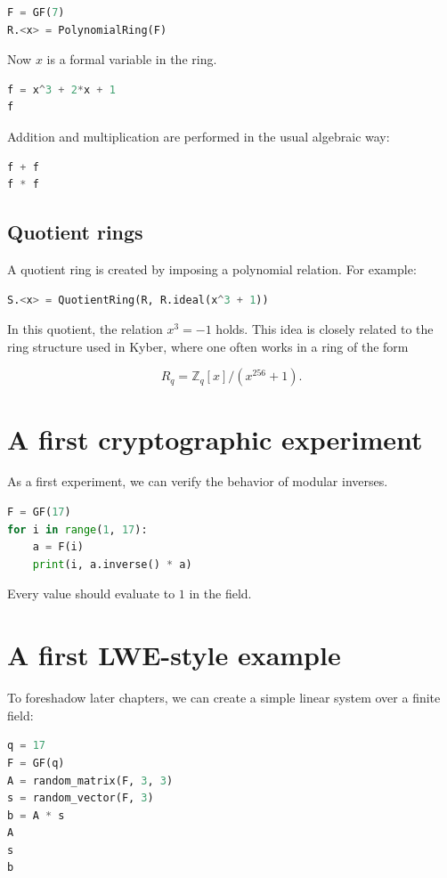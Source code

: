 \begin{lstlisting}[language=Python]
F = GF(7)
R.<x> = PolynomialRing(F)
\end{lstlisting}

Now $x$ is a formal variable in the ring.

\begin{lstlisting}[language=Python]
f = x^3 + 2*x + 1
f
\end{lstlisting}

Addition and multiplication are performed in the usual algebraic way:

\begin{lstlisting}[language=Python]
f + f
f * f
\end{lstlisting}

\subsection{Quotient rings}
A quotient ring is created by imposing a polynomial relation. For example:

\begin{lstlisting}[language=Python]
S.<x> = QuotientRing(R, R.ideal(x^3 + 1))
\end{lstlisting}

In this quotient, the relation $x^3 = -1$ holds. This idea is closely related to the ring structure used in Kyber, where one often works in a ring of the form

\[
R_q = \mathbb{Z}_q[x]/(x^{256}+1).
\]

\section{A first cryptographic experiment}
As a first experiment, we can verify the behavior of modular inverses.

\begin{lstlisting}[language=Python]
F = GF(17)
for i in range(1, 17):
    a = F(i)
    print(i, a.inverse() * a)
\end{lstlisting}

Every value should evaluate to $1$ in the field.

\section{A first LWE-style example}
To foreshadow later chapters, we can create a simple linear system over a finite field:

\begin{lstlisting}[language=Python]
q = 17
F = GF(q)
A = random_matrix(F, 3, 3)
s = random_vector(F, 3)
b = A * s
A
s
b
\end{lstlisting}

